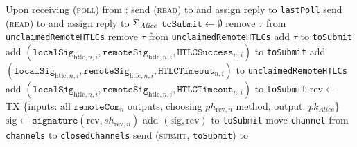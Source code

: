\begin{algorithmic}[1]
    \State Upon receiving (\textsc{poll}) from \environment:
    \Indent
      \State send (\textsc{read}) to \clock{} and assign reply to
      \texttt{lastPoll}
      \State send (\textsc{read}) to \ledger{} and assign reply to
      $\Sigma_{\mathit{Alice}}$
      \State $\mathtt{toSubmit} \gets \emptyset$
         
          \State remove $\tau$ from \texttt{unclaimedRemoteHTLCs}
          \State remove $\tau$ from \texttt{unclaimedRemoteHTLCs}
          \State add $\tau$ to \texttt{toSubmit}
        \EndIf
      \EndFor
         
            \State add $\left(\mathtt{localSig}_{\mathrm{htlc}, n, i},
            \mathtt{remoteSig}_{\mathrm{htlc}, n, i}, \mathtt{HTLCSuccess}_{n,
            i}\right)$ to \texttt{toSubmit}
          \EndFor
              \State add $\left(\mathtt{localSig}_{\mathrm{htlc}, n, i},
              \mathtt{remoteSig}_{\mathrm{htlc}, n, i},
              \mathtt{HTLCTimeout}_{n, i}\right)$ to
              \texttt{unclaimedRemoteHTLCs}
              \State add $\left(\mathtt{localSig}_{\mathrm{htlc}, n, i},
              \mathtt{remoteSig}_{\mathrm{htlc}, n, i},
              \mathtt{HTLCTimeout}_{n, i}\right)$ to \texttt{toSubmit}
            \EndIf
          \EndFor
        \Else {}
          \State $\mathrm{rev} \gets$ TX \{inputs: all $\mathtt{remoteCom}_n$
          outputs, choosing $ph_{\mathrm{rev}, n}$ method, output:
          $pk_{\mathit{Alice}}$\}
          \State $\mathrm{sig} \gets \mathtt{signature}\left(\mathrm{rev},
          sh_{\mathrm{rev}, n}\right)$
          \State add $\left(\mathrm{sig}, \mathrm{rev}\right)$ to
          \texttt{toSubmit}
        \EndIf
        \State move \texttt{channel} from \texttt{channels} to
        \texttt{closedChannels}
      \EndFor
      \State send (\textsc{submit}, \texttt{toSubmit}) to \ledger
    \EndIndent
    \State


\end{algorithmic}
